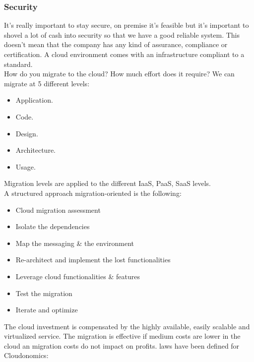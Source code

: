 \subsubsection{Security}
It's really important to stay secure, on premise it's feasible but it's important to shovel a lot of cash into security so that we have a good reliable system. This doesn't mean that the company has any kind of assurance, compliance or certification. \n
A cloud environment comes with an infrastructure compliant to a standard. \\
\miniSpace
How do you migrate to the cloud? How much effort does it require? \n
We can migrate at 5 different levels:
\begin{itemize}
    \item Application.
    \item Code.
    \item Design.
    \item Architecture.
    \item Usage.
\end{itemize}
Migration levels are applied to the different IaaS, PaaS, SaaS levels. \\
A structured approach migration-oriented is the following:
\begin{itemize}
    \item Cloud migration assessment
    \item Isolate the dependencies
    \item Map the messaging \& the environment
    \item Re-architect and implement the lost functionalities
    \item Leverage cloud functionalities \& features
    \item Test the migration
    \item Iterate and optimize
\end{itemize}
The cloud investment is compensated by the highly available, easily scalable and virtualized service. \n
The migration is effective if medium costs are lower in the cloud an migration costs do not impact on profits.  laws have been defined for Cloudonomics:
